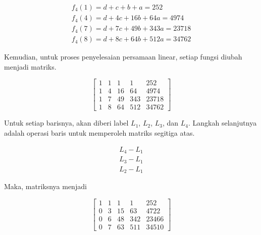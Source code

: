 \begin{gather*}
	f_4(1) = d + c + b + a = 252 \\
	f_4(4) = d + 4c + 16b + 64a = 4974 \\
	f_4(7) = d + 7c + 49b + 343a = 23718 \\
	f_4(8) = d + 8c + 64b + 512a = 34762
\end{gather*}

Kemudian, untuk proses penyelesaian persamaan linear, setiap fungsi diubah menjadi matriks.

\begin{center}
	\setlength\arraycolsep{15pt}
	\[
	\begin{bmatrix}
			1 	& 1 	& 1 	& 1 		& 252 		\\[1em]
			1 	& 4 	& 16 	& 64 		& 4974		\\[1em]
			1 	& 7 	& 49 	& 343 	& 23718		\\[1em]
			1 	& 8 	& 64 	& 512 	& 34762
	\end{bmatrix}
	\]
\end{center}

Untuk setiap barisnya, akan diberi label \begin{math}L_1\end{math}, \begin{math}L_2\end{math}, \begin{math}L_3\end{math}, dan \begin{math}L_4\end{math}. Langkah selanjutnya adalah operasi baris untuk memperoleh matriks segitiga atas.

\begin{align*}
	L_4 - L_1 \\
	L_3 - L_1 \\
	L_2 - L_1
\end{align*}

Maka, matriksnya menjadi

\begin{center}
	\setlength\arraycolsep{15pt}
	\[
	\begin{bmatrix}
			1 	& 1 	& 1 	& 1 		& 252 		\\[1em]
			0 	& 3 	& 15 	& 63 		& 4722		\\[1em]
			0 	& 6 	& 48 	& 342 	& 23466		\\[1em]
			0 	& 7 	& 63 	& 511 	& 34510
	\end{bmatrix}
	\]
\end{center}

